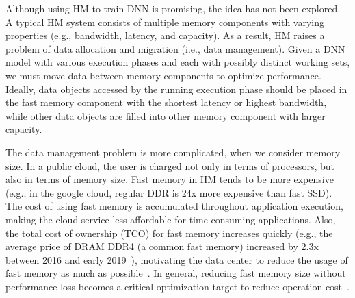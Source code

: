 Although using HM to train DNN is promising, the idea has not been explored. A typical HM system consists of multiple memory components with varying properties (e.g., bandwidth, latency, and capacity). As a result, HM raises a problem of data allocation and migration (i.e., data management). Given a DNN model with various execution phases and each with possibly distinct working sets, we must move data between memory components to optimize performance. Ideally, data objects accessed by the running execution phase should be placed in the fast memory component with the shortest latency or highest bandwidth, while other data objects are filled into other memory component with larger capacity. 



The data management problem is more complicated, when we consider memory size. In a public cloud, the user is charged not only in terms of processors, but also in terms of memory size. Fast memory in HM tends to be more expensive (e.g., in the google cloud, regular DDR is 24x more expensive than fast SSD). The cost of using fast memory is accumulated throughout application execution, making the cloud service less affordable for time-consuming applications. Also, the total cost of ownership (TCO) for fast memory increases quickly (e.g., the average price of DRAM DDR4 (a common fast memory) increased by 2.3x between 2016 and early 2019~\cite{ram_price, ram_price2}), motivating the data center to reduce the usage of fast memory as much as possible~\cite{Eisenman:2018:RDF:3190508.3190524}. In general, reducing fast memory size without performance loss becomes a critical optimization target to reduce operation cost~\cite{DBLP:journals/corr/abs-1901-10938, Eisenman:2018:RDF:3190508.3190524}.  


